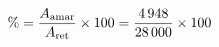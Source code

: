 \documentclass[preview]{standalone}
\begin{document}
\begin{align*}
\special{dvisvgm:raw <g id='unique000'>}\% = \frac{A_{\text{amar}}}{A_{\text{ret}}} \times 100= \frac{4\,948}{28\,000} \times 100\special{dvisvgm:raw </g>}
\end{align*}
\end{document}
